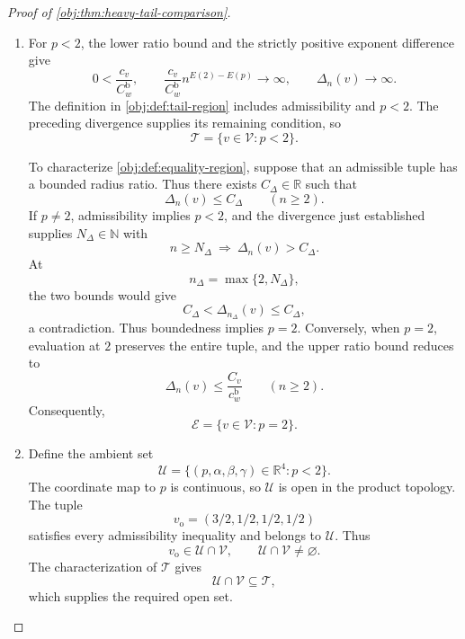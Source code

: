 \begin{proof}[Proof of \cref{obj:thm:heavy-tail-comparison}]
\begin{enumerate}
\item For \(p<2\), the lower ratio bound and the strictly positive exponent difference give
\[
0<\frac{c_v}{C_w^{\mathrm b}},
\qquad
\frac{c_v}{C_w^{\mathrm b}}n^{E(2)-E(p)}
\longrightarrow\infty,
\qquad
\Delta_n(v)\longrightarrow\infty.
\]
The definition in \cref{obj:def:tail-region} includes admissibility and \(p<2\). The preceding divergence supplies its remaining condition, so
\[
\mathcal T=\{v\in\mathcal V:p<2\}.
\]

To characterize \cref{obj:def:equality-region}, suppose that an admissible tuple has a bounded radius ratio. Thus there exists \(C_\Delta\in\mathbb R\) such that
\[
\Delta_n(v)\le C_\Delta
\qquad(n\ge2).
\]
If \(p\ne2\), admissibility implies \(p<2\), and the divergence just established supplies \(N_\Delta\in\mathbb N\) with
\[
n\ge N_\Delta\ \Longrightarrow\ \Delta_n(v)>C_\Delta.
\]
At
\[
n_\Delta=\max\{2,N_\Delta\},
\]
the two bounds would give
\[
C_\Delta<\Delta_{n_\Delta}(v)\le C_\Delta,
\]
a contradiction. Thus boundedness implies \(p=2\). Conversely, when \(p=2\), evaluation at \(2\) preserves the entire tuple, and the upper ratio bound reduces to
\[
\Delta_n(v)\le\frac{C_v}{c_w^{\mathrm b}}
\qquad(n\ge2).
\]
Consequently,
\[
\mathcal E=\{v\in\mathcal V:p=2\}.
\]

\item Define the ambient set
\[
\mathcal U
=\{(p,\alpha,\beta,\gamma)\in\mathbb R^4:p<2\}.
\]
The coordinate map to \(p\) is continuous, so \(\mathcal U\) is open in the product topology. The tuple
\[
v_{\mathrm o}=(3/2,1/2,1/2,1/2)
\]
satisfies every admissibility inequality and belongs to \(\mathcal U\). Thus
\[
v_{\mathrm o}\in\mathcal U\cap\mathcal V,
\qquad
\mathcal U\cap\mathcal V\ne\varnothing.
\]
The characterization of \(\mathcal T\) gives
\[
\mathcal U\cap\mathcal V\subseteq\mathcal T,
\]
which supplies the required open set.


\end{enumerate}
\end{proof}

